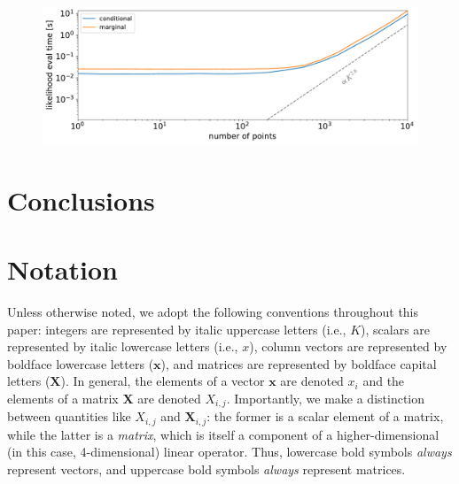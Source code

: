 \documentclass[modern]{aastex62}
\begin{document}
\begin{figure}[t!]
    \begin{centering}
        \includegraphics[width=\linewidth]{figures/speed.pdf}
    \end{centering}
\end{figure}

\section{Conclusions}

%
%
%
%



%
%
%
%

\pagebreak
\appendix

%
%
%
%

\afterpage{
    
    \vfill
    \clearpage
}

%
%
%
%

\section{Notation}
\label{sec:notation}
%
Unless otherwise noted, we adopt
the following conventions throughout this paper:
integers are represented by italic uppercase letters (i.e., $K$),
scalars are represented by italic lowercase
letters (i.e., $x$), column vectors are
represented by boldface lowercase letters
($\mathbf{x}$), and matrices are represented
by boldface capital letters ($\mathbf{X}$). In general, the elements of a vector
$\mathbf{x}$ are denoted $x_i$ and the elements of a matrix $\mathbf{X}$
are denoted $X_{i,j}$. Importantly, we make a distinction between
quantities like $X_{i,j}$ and $\mathbf{X}_{i,j}$: the former is a scalar
element of a matrix, while the latter is a \emph{matrix}, which is itself
a component of a higher-dimensional (in this case, 4-dimensional) linear
operator. Thus, lowercase bold symbols \emph{always} represent vectors, and
uppercase bold symbols \emph{always} represent matrices.
\end{document}
